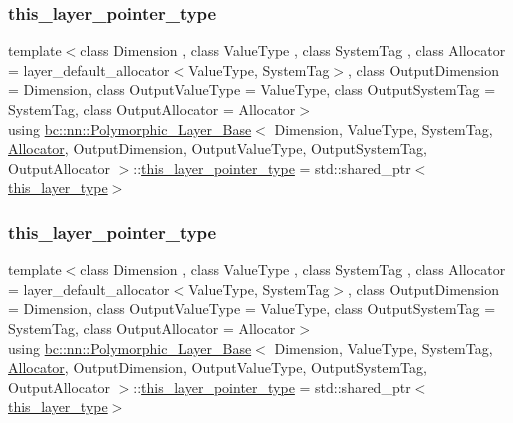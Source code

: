 \subsubsection{\texorpdfstring{this\+\_\+layer\+\_\+pointer\+\_\+type}{this\_layer\_pointer\_type}\hspace{0.1cm}{\footnotesize\ttfamily [1/2]}}
{\footnotesize\ttfamily template$<$class Dimension , class Value\+Type , class System\+Tag , class Allocator  = layer\+\_\+default\+\_\+allocator$<$\+Value\+Type, System\+Tag$>$, class Output\+Dimension  = Dimension, class Output\+Value\+Type  = Value\+Type, class Output\+System\+Tag  = System\+Tag, class Output\+Allocator  = Allocator$>$ \\
using \hyperlink{structbc_1_1nn_1_1Polymorphic__Layer__Base}{bc\+::nn\+::\+Polymorphic\+\_\+\+Layer\+\_\+\+Base}$<$ Dimension, Value\+Type, System\+Tag, \hyperlink{classbc_1_1allocators_1_1Allocator}{Allocator}, Output\+Dimension, Output\+Value\+Type, Output\+System\+Tag, Output\+Allocator $>$\+::\hyperlink{structbc_1_1nn_1_1Polymorphic__Layer__Base_a6240b9012fcc8ed91d8a41f07d7c4bd9}{this\+\_\+layer\+\_\+pointer\+\_\+type} =  std\+::shared\+\_\+ptr$<$\hyperlink{structbc_1_1nn_1_1Polymorphic__Layer__Base_a6087076d2e0a31e6bbdc2c2039c3ab52}{this\+\_\+layer\+\_\+type}$>$}

\mbox{\label{structbc_1_1nn_1_1Polymorphic__Layer__Base_a6240b9012fcc8ed91d8a41f07d7c4bd9}} 
\subsubsection{\texorpdfstring{this\+\_\+layer\+\_\+pointer\+\_\+type}{this\_layer\_pointer\_type}\hspace{0.1cm}{\footnotesize\ttfamily [2/2]}}
{\footnotesize\ttfamily template$<$class Dimension , class Value\+Type , class System\+Tag , class Allocator  = layer\+\_\+default\+\_\+allocator$<$\+Value\+Type, System\+Tag$>$, class Output\+Dimension  = Dimension, class Output\+Value\+Type  = Value\+Type, class Output\+System\+Tag  = System\+Tag, class Output\+Allocator  = Allocator$>$ \\
using \hyperlink{structbc_1_1nn_1_1Polymorphic__Layer__Base}{bc\+::nn\+::\+Polymorphic\+\_\+\+Layer\+\_\+\+Base}$<$ Dimension, Value\+Type, System\+Tag, \hyperlink{classbc_1_1allocators_1_1Allocator}{Allocator}, Output\+Dimension, Output\+Value\+Type, Output\+System\+Tag, Output\+Allocator $>$\+::\hyperlink{structbc_1_1nn_1_1Polymorphic__Layer__Base_a6240b9012fcc8ed91d8a41f07d7c4bd9}{this\+\_\+layer\+\_\+pointer\+\_\+type} =  std\+::shared\+\_\+ptr$<$\hyperlink{structbc_1_1nn_1_1Polymorphic__Layer__Base_a6087076d2e0a31e6bbdc2c2039c3ab52}{this\+\_\+layer\+\_\+type}$>$}

